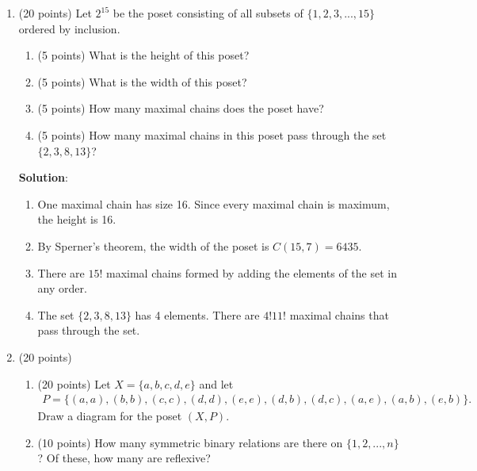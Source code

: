 \documentclass[12pt]{article}
\newenvironment{solution}{
\begin{mdframed}
  { {\bfseries Solution}: }}{
\end{mdframed}}
\begin{document}
\begin{enumerate}
    \begin{solution}
      \begin{align*}
        P = \{ & (a, a), (b, b), (c, c), (d, d), (e, e), (f, f), (g, g), (h, h), \\
               & (a, d), (b, a), (b, c), (b, d), (c, d), (e, a), (e, c), (e, d), \\
               & (e, f), (e, g), (f, a), (f, c), (f, d), (f, g), (h, c), (h, d) \}
      \end{align*}
    \end{solution}

    \pagebreak

    \item (20 points) Let \(2^{15}\) be the poset consisting of all subsets of \(\{1, 2, 3, ..., 15\}\) ordered by inclusion.
    \begin{enumerate}[label=({\alph*})]
      \item (5 points) What is the height of this poset?
      \item (5 points) What is the width of this poset?
      \item (5 points) How many maximal chains does the poset have?
      \item (5 points) How many maximal chains in this poset pass through the set \(\{2, 3, 8, 13\}\)?
    \end{enumerate}

    \begin{solution}
      \begin{enumerate}[label=({\alph*})]
        \item One maximal chain has size 16. Since every maximal chain is maximum, the height is 16.
        \item By Sperner's theorem, the width of the poset is \(C(15, 7) = 6435\).
        \item There are \(15!\) maximal chains formed by adding the elements of the set in any order.
        \item The set \(\{2, 3, 8, 13\}\) has 4 elements. There are \(4! 11!\) maximal chains that pass through the set.
      \end{enumerate}
    \end{solution}

    \pagebreak

    \item (20 points)
    \begin{enumerate}[label=({\alph*})]
      \item (20 points) Let \(X = \{a, b, c, d, e\}\) and let
      \begin{align*}
        P = \{(a, a), (b, b), (c, c), (d, d), (e, e), (d, b), (d, c), (a, e), (a, b), (e, b)\}.
      \end{align*}
      Draw a diagram for the poset \((X, P)\).
      \item (10 points) How many symmetric binary relations are there on \(\{1, 2, ..., n\}\)?
      Of these, how many are reflexive?
    \end{enumerate}


\end{enumerate}
\end{document}
